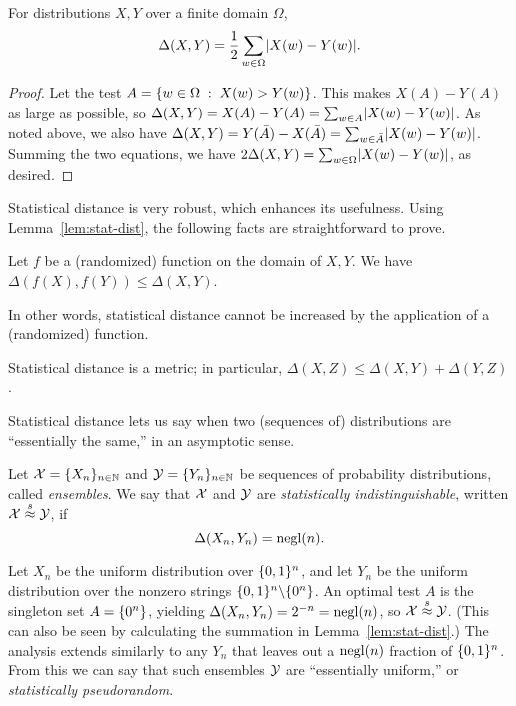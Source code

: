 \documentclass[11pt]{article}
\begin{document}
\begin{lemma}
  \label{lem:stat-dist}
  For distributions $X,Y$ over a finite domain $\Omega$, \[
  \Delta(X,Y) = \frac12 \sum_{w \in \Omega} \lvert X(w) - Y(w)\rvert. \]
\end{lemma}

\begin{proof}
  Let the test $A = \{w \in \Omega\; :\; X(w) > Y(w)\}$.  This makes
  $X(A) - Y(A)$ as large as possible, so $\Delta(X,Y) = X(A)-Y(A) =
  \sum_{w \in A} \lvert X(w)-Y(w)\rvert$.  As noted above, we also have
  $\Delta(X,Y) = Y(\bar{A})-X(\bar{A}) = \sum_{w \in \bar{A}}
  \lvert X(w)-Y(w)\rvert$.  Summing the two equations, we have $2\Delta(X,Y)
  = \sum_{w \in \Omega} \lvert X(w)-Y(w)\rvert$, as desired.
\end{proof}

Statistical distance is very robust, which enhances its usefulness.
Using Lemma~\ref{lem:stat-dist}, the following facts are
straightforward to prove.

\begin{lemma}
  Let $f$ be a (randomized) function on the domain of $X,Y$.  We have
  $\Delta(f(X), f(Y)) \leq \Delta(X,Y)$.
\end{lemma}

In other words, statistical distance cannot be increased by the application
of a (randomized) function.

\begin{lemma}
  Statistical distance is a metric; in particular, $\Delta(X,Z) \leq
  \Delta(X,Y) + \Delta(Y,Z)$.
\end{lemma}

Statistical distance lets us say when two (sequences of) distributions
are ``essentially the same,'' in an asymptotic sense.

\begin{definition}
  \label{def:stat-ind}
  Let $\mathcal{X} = \{X_{n}\}_{n \in \mathbb{N}}$ and $\mathcal{Y} = \{Y_{n}\}_{n \in
    \mathbb{N}}$ be sequences of probability distributions, called
  \emph{ensembles}.  We say that $\mathcal{X}$ and $\mathcal{Y}$ are
  \emph{statistically indistinguishable}, written $\mathcal{X} \stackrel{s}{\approx}
  \mathcal{Y}$, if \[ \Delta(X_{n}, Y_{n}) = \operatorname{negl}(n). \]
\end{definition}

\begin{example}
  Let $X_{n}$ be the uniform distribution over $\{0,1\}^{n}$, and let
  $Y_{n}$ be the uniform distribution over the nonzero strings
  $\{0,1\}^{n} \backslash \{0^{n}\}$.  An optimal test $A$ is the
  singleton set $A = \{0^{n}\}$, yielding $\Delta(X_{n}, Y_{n}) =
  2^{-n} = \operatorname{negl}(n)$, so $\mathcal{X} \stackrel{s}{\approx} \mathcal{Y}$.  (This can also be
  seen by calculating the summation in Lemma~\ref{lem:stat-dist}.)
  The analysis extends similarly to any $Y_{n}$ that leaves out a
  $\operatorname{negl}(n)$ fraction of $\{0,1\}^{n}$.  From this we can say that such
  ensembles $\mathcal{Y}$ are ``essentially uniform,'' or
  \emph{statistically pseudorandom}.
\end{example}
\end{document}

